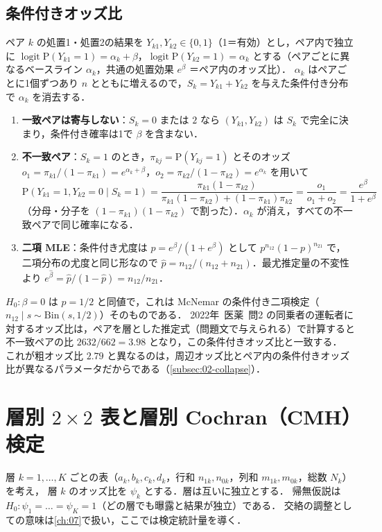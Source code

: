 \documentclass[a4paper,11pt,openany]{ltjsbook}
\newcommand{\tagbox}[2]{\tcbox[on line,boxsep=0.5pt,left=2pt,right=2pt,top=0.5pt,bottom=0.5pt,
  colframe=#1,colback=#1!10,boxrule=0.4pt,arc=1pt]{\scriptsize\bfseries\textcolor{#1}{#2}}}
\newcommand{\Hinshutsu}{\tagbox{bkorange}{頻出}}
\newcommand{\kakomon}[2]{\mbox{#1年 医薬 問#2}}
\newcommand{\Prob}{\mathrm{P}}
\newcommand{\logit}{\operatorname{logit}}
\newcommand{\Bin}{\mathrm{Bin}}
\begin{document}
\subsection{条件付きオッズ比}\label{subsec:04-condor}
ペア $k$ の処置1・処置2の結果を $Y_{k1},Y_{k2}\in\{0,1\}$（1＝有効）とし，ペア内で独立に
$\logit\Prob(Y_{k1}=1)=\alpha_k+\beta$，$\logit\Prob(Y_{k2}=1)=\alpha_k$ とする（ペアごとに異なるベースライン $\alpha_k$，共通の処置効果 $e^\beta$ ＝ペア内のオッズ比）．
$\alpha_k$ はペアごとに1個ずつあり $n$ とともに増えるので，$S_k=Y_{k1}+Y_{k2}$ を与えた条件付き分布で $\alpha_k$ を消去する．
\begin{enumerate}[label=(\roman*)]
\item \textbf{一致ペアは寄与しない}：$S_k=0$ または $2$ なら $(Y_{k1},Y_{k2})$ は $S_k$ で完全に決まり，条件付き確率は1で $\beta$ を含まない．
\item \textbf{不一致ペア}：$S_k=1$ のとき，$\pi_{kj}=\Prob(Y_{kj}=1)$ とそのオッズ $o_1=\pi_{k1}/(1-\pi_{k1})=e^{\alpha_k+\beta}$，$o_2=\pi_{k2}/(1-\pi_{k2})=e^{\alpha_k}$ を用いて
      \[
      \Prob(Y_{k1}=1,Y_{k2}=0\mid S_k=1)=\frac{\pi_{k1}(1-\pi_{k2})}{\pi_{k1}(1-\pi_{k2})+(1-\pi_{k1})\pi_{k2}}=\frac{o_1}{o_1+o_2}=\frac{e^\beta}{1+e^\beta}
      \]
      （分母・分子を $(1-\pi_{k1})(1-\pi_{k2})$ で割った）．$\alpha_k$ が消え，すべての不一致ペアで同じ確率になる．
\item \textbf{二項 MLE}：条件付き尤度は $p=e^\beta/(1+e^\beta)$ として $p^{n_{12}}(1-p)^{n_{21}}$ で，二項分布の尤度と同じ形なので
      $\hat p=n_{12}/(n_{12}+n_{21})$．最尤推定量の不変性より $e^{\hat\beta}=\hat p/(1-\hat p)=n_{12}/n_{21}$．
\end{enumerate}
$H_0:\beta=0$ は $p=1/2$ と同値で，これは McNemar の条件付き二項検定（$n_{12}\mid s\sim\Bin(s,1/2)$）そのものである．
\kakomon{2022}{2} の同乗者の運転者に対するオッズ比は，ペアを層とした推定式（問題文で与えられる）で計算すると不一致ペアの比 $2632/662=3.98$ となり，この条件付きオッズ比と一致する．
これが粗オッズ比 $2.79$ と異なるのは，周辺オッズ比とペア内の条件付きオッズ比が異なるパラメータだからである（\cref{subsec:02-collapse}）．

\section{層別 \texorpdfstring{$2\times2$}{2×2} 表と層別 Cochran（CMH）検定}\label{sec:04-mh}
\Hinshutsu 層 $k=1,\dots,K$ ごとの表（$a_k,b_k,c_k,d_k$，行和 $n_{1k},n_{0k}$，列和 $m_{1k},m_{0k}$，総数 $N_k$）を考え，
層 $k$ のオッズ比を $\psi_k$ とする．層は互いに独立とする．
帰無仮説は $H_0:\psi_1=\dots=\psi_K=1$（どの層でも曝露と結果が独立）である．
交絡の調整としての意味は\cref{ch:07}で扱い，ここでは検定統計量を導く．
\end{document}
